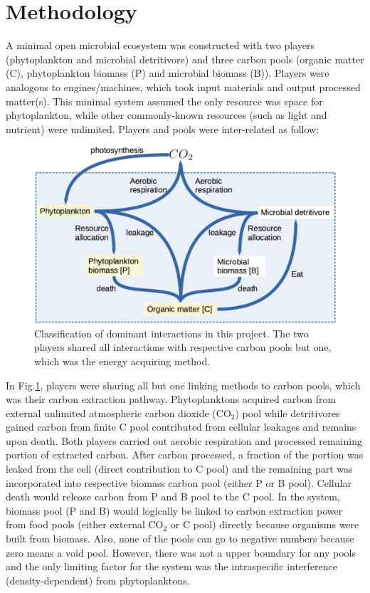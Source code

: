 \documentclass[../thesis.tex]{subfiles} %
\begin{document}
\section{Methodology}
A minimal open microbial ecosystem was constructed with two players (phytoplankton and microbial detritivore) and three carbon pools (organic matter (C), phytoplankton biomass (P) and microbial biomass (B)).  Players were analogous to engines/machines, which took input materials and output processed matter(s).  This minimal system assumed the only resource was space for phytoplankton, while other commonly-known resources (such as light and nutrient) were unlimited.  Players and pools were inter-related as follow:

\begin{figure}[H]
    \centering
    \includegraphics[width=.8\linewidth]{result/model.png}
    \caption[Model visualization]{Classification of dominant interactions in this project.  The two players shared all interactions with respective carbon pools but one, which was the energy acquiring method.}
    \label{modelInWord}
\end{figure}

In Fig.\ref{modelInWord}, players were sharing all but one linking methods to carbon pools, which was their carbon extraction pathway.  Phytoplanktons acquired carbon from external unlimited atmospheric carbon dioxide (CO$_2$) pool while detritivores gained carbon from finite C pool contributed from cellular leakages and remains upon death.  Both players carried out aerobic respiration and processed remaining portion of extracted carbon.  After carbon processed, a fraction of the portion was leaked from the cell (direct contribution to C pool) and the remaining part was incorporated into respective biomass carbon pool (either P or B pool).  Cellular death would release carbon from P and B pool to the C pool.  In the system, biomass pool (P and B) would logically be linked to carbon extraction power from food pools (either external CO$_2$ or C pool) directly because organisms were built from biomass.  Also, none of the pools can go to negative numbers because zero means a void pool.  However, there was not a upper boundary for any pools and the only limiting factor for the system was the intraspecific interference (density-dependent) from phytoplanktons.
\end{document}
